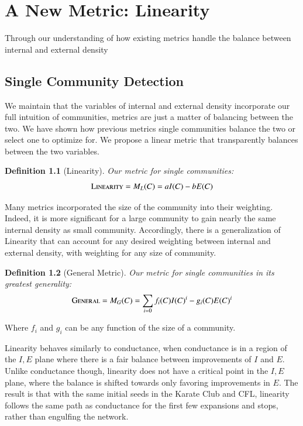 \documentclass[phd,tocprelim]{cornell}
\newtheorem{definition}{Definition}
\begin{document}
\chapter{A New Metric: Linearity}

Through our understanding of how existing metrics handle the balance between internal and external density


\section{Single Community Detection}
We maintain that the variables of internal and external density incorporate our full intuition of communities, metrics are just a matter of balancing between the two.  We have shown how previous metrics single communities balance the two or select one to optimize for.  We propose a linear metric that transparently balances between the two variables.
\begin{definition}[Linearity]
 Our metric for single communities:
  \begin{equation}
   \mbox{\sc Linearity} = M_L(C) = a I(C) - b E(C)
  \end{equation}
\end{definition}
Many metrics incorporated the size of the community into their weighting.  Indeed, it is more significant for a large community to gain nearly the same internal density as small community.  Accordingly, there is a generalization of {\sc Linearity} that can account for any desired weighting between internal and external density, with weighting for any size of community.
\begin{definition}[General Metric]
 Our metric for single communities in its greatest generality:
  \begin{equation}
   \mbox{\sc General} = M_G(C)  = \sum\limits_{i = 0} f_i(C) I(C)^i - g_i(C) E(C)^i
  \end{equation}
\end{definition}
Where $f_i$ and $g_i$ can be any function of the size of a community.

Linearity behaves similarly to conductance, when conductance is in a region of the $I,E$ plane where there is a fair balance between improvements of $I$ and $E$.  Unlike conductance though, linearity does not have a critical point in the $I,E$ plane, where the balance is shifted towards only favoring improvements in $E$.  The result is that with the same initial seeds in the Karate Club and CFL, linearity follows the same path as conductance for the first few expansions and stops, rather than engulfing the network.
\end{document}
